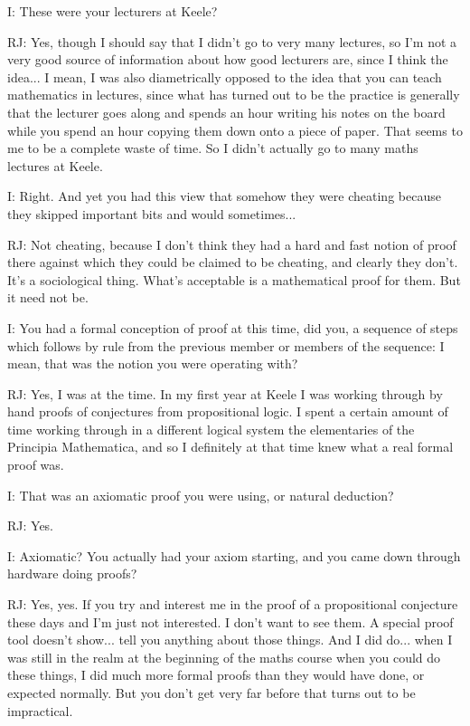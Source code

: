 \documentclass[10pt,titlepage]{book}
\begin{document}
I: These were your lecturers at Keele?

RJ: Yes, though I should say that I didn't go to very many lectures, so I'm not a very good source of information about how good lecturers are, since I think the idea... I mean, I was also diametrically opposed to the idea that you can teach mathematics in lectures, since what has turned out to be the practice is generally that the lecturer goes along and spends an hour writing his notes on the board while you spend an hour copying them down onto a piece of paper. That seems to me to be a complete waste of time. So I didn't actually go to many maths lectures at Keele.

I: Right. And yet you had this view that somehow they were cheating because they skipped important bits and would sometimes...

RJ: Not cheating, because I don't think they had a hard and fast notion of proof there against which they could be claimed to be cheating, and clearly they don't.
It's a sociological thing.
What's acceptable is a mathematical proof for them.
But it need not be.

I: You had a formal conception of proof at this time, did you, a sequence of steps which follows by rule from the previous member or members of the sequence: I mean, that was the notion you were operating with?

RJ: Yes, I was at the time.
In my first year at Keele I was working through by hand proofs of conjectures from propositional logic.
I spent a certain amount of time working through in a different logical system the elementaries of the Principia Mathematica, and so I definitely at that time knew what a real formal proof was.

I: That was an axiomatic proof you were using, or natural deduction?

RJ: Yes.

I: Axiomatic? You actually had your axiom starting, and you came down through hardware doing proofs?

RJ: Yes, yes.
If you try and interest me in the proof of a propositional conjecture these days and I'm just not interested.
I don't want to see them.
A special proof tool doesn't show... tell you anything about those things.
And I did do... when I was still in the realm at the beginning of the maths course when you could do these things, I did much more formal proofs than they would have done, or expected normally.
But you don't get very far before that turns out to be impractical.
\end{document}
